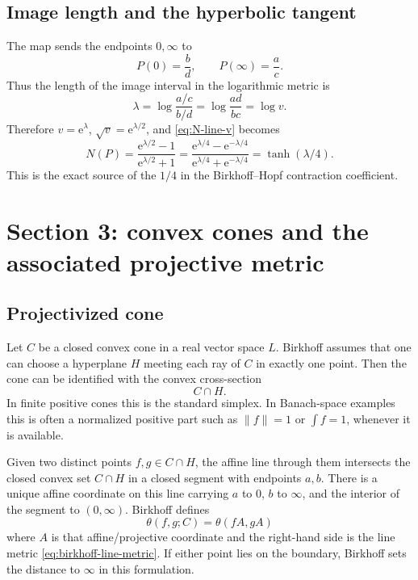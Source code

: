 \documentclass[11pt]{article}
\newcommand{\e}{\mathrm{e}}
\begin{document}
\subsection{Image length and the hyperbolic tangent}
The map sends the endpoints \(0,\infty\) to
\[
  P(0)=\frac{b}{d},\qquad P(\infty)=\frac{a}{c}.
\]
Thus the length of the image interval in the logarithmic metric is
\begin{equation}
  \lambda=\log\frac{a/c}{b/d}=\log\frac{ad}{bc}=\log v.
\end{equation}
Therefore \(v=\e^\lambda\), \(\sqrt v=\e^{\lambda/2}\), and \eqref{eq:N-line-v} becomes
\[
  N(P)=\frac{\e^{\lambda/2}-1}{\e^{\lambda/2}+1}
       =\frac{\e^{\lambda/4}-\e^{-\lambda/4}}{\e^{\lambda/4}+\e^{-\lambda/4}}
       =\tanh(\lambda/4).
\]
This is the exact source of the \(1/4\) in the Birkhoff--Hopf contraction coefficient.

\section{Section 3: convex cones and the associated projective metric}

\subsection{Projectivized cone}
Let \(C\) be a closed convex cone in a real vector space \(L\).  Birkhoff assumes that one can choose a hyperplane \(H\) meeting each ray of \(C\) in exactly one point.  Then the cone can be identified with the convex cross-section
\[
  C\cap H.
\]
In finite positive cones this is the standard simplex.  In Banach-space examples this is often a normalized positive part such as \(\|f\|=1\) or \(\int f=1\), whenever it is available.

Given two distinct points \(f,g\in C\cap H\), the affine line through them intersects the closed convex set \(C\cap H\) in a closed segment with endpoints \(a,b\).  There is a unique affine coordinate on this line carrying \(a\) to \(0\), \(b\) to \(\infty\), and the interior of the segment to \((0,\infty)\).  Birkhoff defines
\begin{equation}
  \theta(f,g;C)=\theta(fA,gA)
  \label{eq:theta-cone}
\end{equation}
where \(A\) is that affine/projective coordinate and the right-hand side is the line metric \eqref{eq:birkhoff-line-metric}.  If either point lies on the boundary, Birkhoff sets the distance to \(\infty\) in this formulation.
\end{document}
